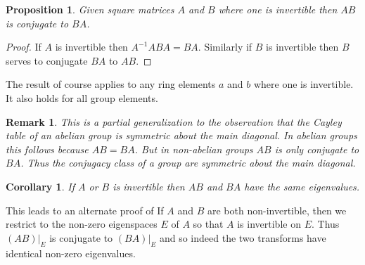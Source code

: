 \documentclass[12pt]{article}
\newtheorem{coro}[thm]{Corollary}
\newtheorem{prop}[thm]{Proposition}
\newtheorem{remark}[thm]{Remark}
\begin{document}
\begin{prop}
Given square matrices $A$ and $B$ where one is invertible then $AB$ is conjugate to $BA$.
\end{prop}
\begin{proof}
If $A$ is invertible then $A^{-1} ABA=BA$.  Similarly if $B$ is invertible then
$B$ serves to conjugate $BA$ to $AB$.
\end{proof}


The result of course applies to any ring elements $a$ and $b$ where one is invertible.  It also holds for all group elements.

\begin{remark}
This is a partial generalization to the observation that the Cayley table of an abelian group is symmetric about the main diagonal.  In abelian groups this follows because $AB=BA$.  But in non-abelian groups $AB$ is only conjugate to $BA$.  Thus the conjugacy class of a group are symmetric about the main diagonal.
\end{remark}
 
\begin{coro}
If $A$ or $B$ is invertible then $AB$ and $BA$ have the same eigenvalues.
\end{coro}

This leads to an alternate proof of   If $A$ and $B$ are both non-invertible, then we restrict to the non-zero eigenspaces $E$ of $A$ so that $A$ is invertible on $E$.  Thus $(AB)|_E$ is conjugate to $(BA)|_E$ and so indeed the two transforms have identical non-zero eigenvalues.
\end{document}

